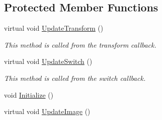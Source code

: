 \subsection*{Protected Member Functions}
\begin{DoxyCompactItemize}
\item 
virtual void \hyperlink{classosa_o_s_g_image_a4293445d5104d1d30100528b5e87dfe8}{Update\+Transform} ()
\begin{DoxyCompactList}\small\item\em This method is called from the transform callback. \end{DoxyCompactList}\item 
virtual void \hyperlink{classosa_o_s_g_image_a491071217b513d3faa7a89eb6fff0808}{Update\+Switch} ()
\begin{DoxyCompactList}\small\item\em This method is called from the switch callback. \end{DoxyCompactList}\item 
void \hyperlink{classosa_o_s_g_image_a411b66846a100e09a8a642ebdac50541}{Initialize} ()
\item 
virtual void \hyperlink{classosa_o_s_g_image_a72cd21e7b7e8c272737c7499d05b54ac}{Update\+Image} ()
\end{DoxyCompactItemize}
